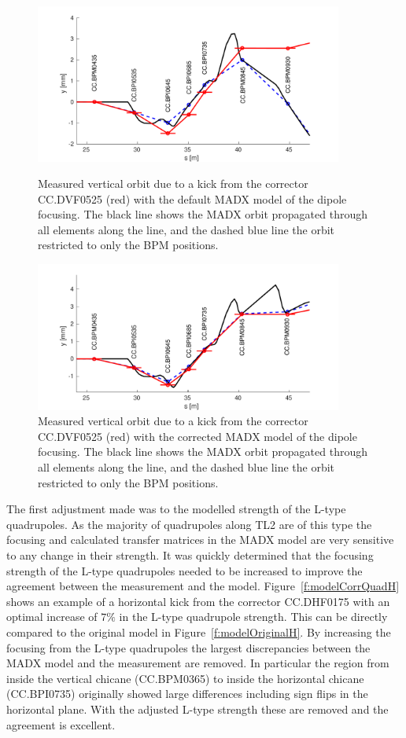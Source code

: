 \begin{figure}
  \centering
  \includegraphics[width=0.9\textwidth]{Figures/optics/modelOrigBendV}
  \caption{Measured vertical orbit due to a kick from the corrector CC.DVF0525 (red) with the default MADX model of the dipole focusing. The black line shows the MADX orbit propagated through all elements along the line, and the dashed blue line the orbit restricted to only the BPM positions.}
  \label{f:modelOrigBendV}
  \includegraphics[width=0.9\textwidth]{Figures/optics/modelCorrBendV}
  \caption{Measured vertical orbit due to a kick from the corrector CC.DVF0525 (red) with the corrected MADX model of the dipole focusing. The black line shows the MADX orbit propagated through all elements along the line, and the dashed blue line the orbit restricted to only the BPM positions.}
  \label{f:modelCorrBendV}
\end{figure}


The first adjustment made was to the modelled strength of the L-type quadrupoles. As the majority of quadrupoles along TL2 are of this type the focusing and calculated transfer matrices in the MADX model are very sensitive to any change in their strength. It was quickly determined that the focusing strength of the L-type quadrupoles needed to be increased to improve the agreement between the measurement and the model. Figure~\ref{f:modelCorrQuadH} shows an example of a horizontal kick from the corrector CC.DHF0175 with an optimal increase of \(7\%\) in the L-type quadrupole strength. This can be directly compared to the original model in Figure~\ref{f:modelOriginalH}. By increasing the focusing from the L-type quadrupoles the largest discrepancies between the MADX model and the measurement are removed. In particular the region from inside the vertical chicane (CC.BPM0365) to inside the horizontal chicane (CC.BPI0735) originally showed large differences including sign flips in the horizontal plane. With the adjusted L-type strength these are removed and the agreement is excellent.

